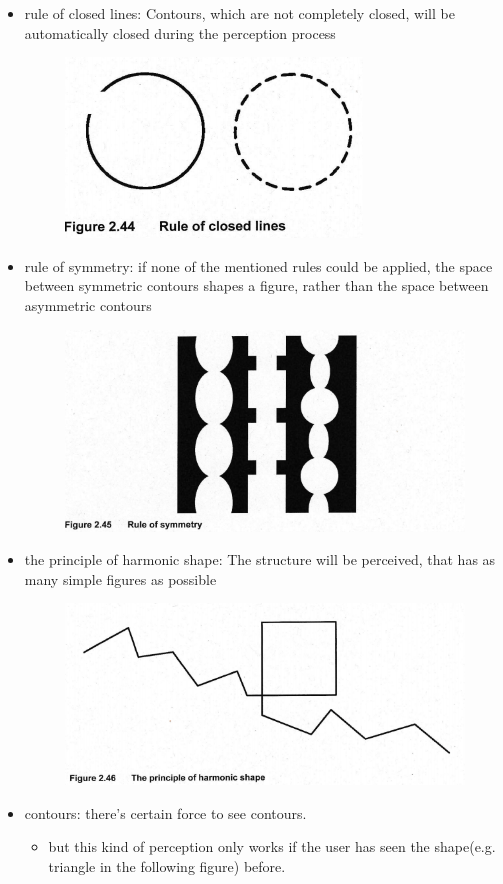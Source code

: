 \documentclass{standalone}
\begin{document}
\begin{itemize}
\begin{figure}[H]
	\end{figure}
	\item rule of closed lines: Contours, which are not completely closed, will be automatically closed during the perception process
		\begin{figure}[H]
			\centering
			\includegraphics[width = 0.5\linewidth]{Figures/2_44.png}
			\end{figure}
	\item rule of symmetry: if none of the mentioned rules could be applied, the space between symmetric contours shapes a figure, rather than the space between asymmetric contours
		\begin{figure}[H]
			\centering
			\includegraphics[width = 0.5\linewidth]{Figures/2_45.png}
		\end{figure}
	\item the principle of harmonic shape: The structure will be perceived, that has as many simple figures as possible
		\begin{figure}[H]
		\centering
		\includegraphics[width = 0.5\linewidth]{Figures/2_46.png}
		\end{figure}
	\item contours: there's certain force to see contours.
		\begin{itemize}
			\item but this kind of perception only works if the user has seen the shape(e.g. triangle in the following figure) before.

\end{itemize}
\end{itemize}
\end{document}
